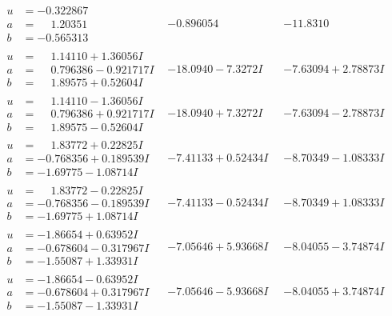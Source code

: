 \documentclass[1p]{elsarticle_modified}
\theoremstyle{definition}
\begin{document}
$$\begin{array}{c|c|c}
\begin{aligned}
u &= -0.322867\phantom{ +0.000000I} \\
a &= \phantom{-}1.20351\phantom{ +0.000000I} \\
b &= -0.565313\phantom{ +0.000000I}\end{aligned}
 & -0.896054\phantom{ +0.000000I} & -11.8310\phantom{ +0.000000I} \\ \hline\begin{aligned}
u &= \phantom{-}1.14110 + 1.36056 I \\
a &= \phantom{-}0.796386 - 0.921717 I \\
b &= \phantom{-}1.89575 + 0.52604 I\end{aligned}
 & -18.0940 - 7.3272 I & -7.63094 + 2.78873 I \\ \hline\begin{aligned}
u &= \phantom{-}1.14110 - 1.36056 I \\
a &= \phantom{-}0.796386 + 0.921717 I \\
b &= \phantom{-}1.89575 - 0.52604 I\end{aligned}
 & -18.0940 + 7.3272 I & -7.63094 - 2.78873 I \\ \hline\begin{aligned}
u &= \phantom{-}1.83772 + 0.22825 I \\
a &= -0.768356 + 0.189539 I \\
b &= -1.69775 - 1.08714 I\end{aligned}
 & -7.41133 + 0.52434 I & -8.70349 - 1.08333 I \\ \hline\begin{aligned}
u &= \phantom{-}1.83772 - 0.22825 I \\
a &= -0.768356 - 0.189539 I \\
b &= -1.69775 + 1.08714 I\end{aligned}
 & -7.41133 - 0.52434 I & -8.70349 + 1.08333 I \\ \hline\begin{aligned}
u &= -1.86654 + 0.63952 I \\
a &= -0.678604 - 0.317967 I \\
b &= -1.55087 + 1.33931 I\end{aligned}
 & -7.05646 + 5.93668 I & -8.04055 - 3.74874 I \\ \hline\begin{aligned}
u &= -1.86654 - 0.63952 I \\
a &= -0.678604 + 0.317967 I \\
b &= -1.55087 - 1.33931 I\end{aligned}
 & -7.05646 - 5.93668 I & -8.04055 + 3.74874 I \\ \hline\begin{aligned}

\end{aligned}
\end{array}$$
\end{document}
